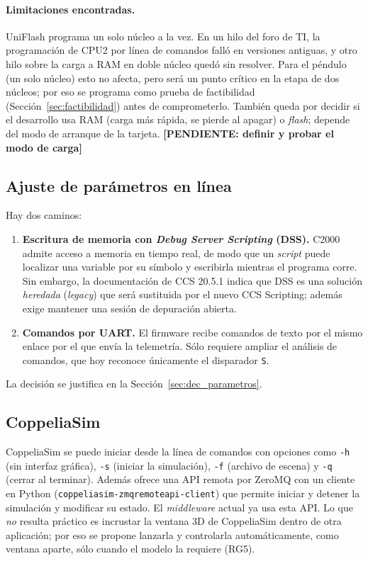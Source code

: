 \documentclass[12pt,letterpaper]{article}
\newcommand{\pendiente}[1]{\textbf{[PENDIENTE: #1]}}
\begin{document}
\paragraph{Limitaciones encontradas.} UniFlash programa un solo núcleo a la vez. En un hilo del foro de TI, la programación de CPU2 por línea de comandos falló en versiones antiguas, y otro hilo sobre la carga a RAM en doble núcleo quedó sin resolver. Para el péndulo (un solo núcleo) esto no afecta, pero será un punto crítico en la etapa de dos núcleos; por eso se programa como prueba de factibilidad (Sección~\ref{sec:factibilidad}) antes de comprometerlo. También queda por decidir si el desarrollo usa RAM (carga más rápida, se pierde al apagar) o \textit{flash}; depende del modo de arranque de la tarjeta. \pendiente{definir y probar el modo de carga}

\subsection{Ajuste de parámetros en línea}

Hay dos caminos:
\begin{enumerate}
    \item \textbf{Escritura de memoria con \textit{Debug Server Scripting} (DSS).} C2000 admite acceso a memoria en tiempo real, de modo que un \textit{script} puede localizar una variable por su símbolo y escribirla mientras el programa corre. Sin embargo, la documentación de CCS 20.5.1 indica que DSS es una solución \emph{heredada} (\textit{legacy}) que será sustituida por el nuevo CCS Scripting; además exige mantener una sesión de depuración abierta.
    \item \textbf{Comandos por UART.} El firmware recibe comandos de texto por el mismo enlace por el que envía la telemetría. Sólo requiere ampliar el análisis de comandos, que hoy reconoce únicamente el disparador \texttt{S}.
\end{enumerate}
La decisión se justifica en la Sección~\ref{sec:dec_parametros}.

\subsection{CoppeliaSim}

CoppeliaSim se puede iniciar desde la línea de comandos con opciones como \texttt{-h} (sin interfaz gráfica), \texttt{-s} (iniciar la simulación), \texttt{-f} (archivo de escena) y \texttt{-q} (cerrar al terminar). Además ofrece una API remota por ZeroMQ con un cliente en Python (\texttt{coppeliasim-zmqremoteapi-client}) que permite iniciar y detener la simulación y modificar su estado. El \textit{middleware} actual ya usa esta API. Lo que \emph{no} resulta práctico es incrustar la ventana 3D de CoppeliaSim dentro de otra aplicación; por eso se propone lanzarla y controlarla automáticamente, como ventana aparte, sólo cuando el modelo la requiere (RG5).
\end{document}
